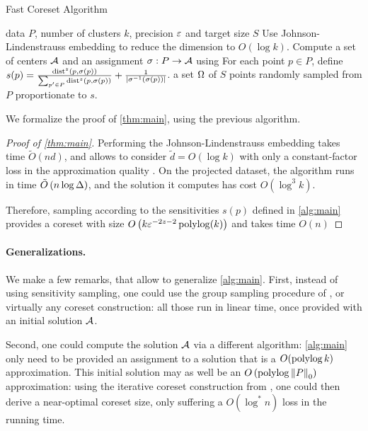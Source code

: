 \begin{algorithm}[tb]
   \caption{Fast Coreset Algorithm}
   \label{alg:main}
\begin{algorithmic}
    data $P$, number of clusters $k$, precision $\varepsilon$ and target size $S$
   \STATE Use Johnson-Lindenstrauss embedding to reduce the dimension to $O(\log k)$.
   \STATE Compute a set of centers $\mathcal A$ and an assignment $\sigma : P \rightarrow \mathcal A$ using \fkmeans
   \STATE For each point $p \in P$, define $s(p) = \frac{\operatorname{dist}^z(p, \sigma(p))}{\sum_{p' \in P} \operatorname{dist}^z(p, \sigma(p))} + \frac{1}{|\sigma^{-1}(\sigma(p))|}$.
    a set $\Omega$ of $S$ points randomly sampled from $P$ proportionate to $s$.
\end{algorithmic}
\end{algorithm}


We formalize the proof of \cref{thm:main}, using the previous algorithm.

\begin{proof}[Proof of \cref{thm:main}]
Performing the Johnson-Lindenstrauss embedding takes time $\tilde O(nd)$, and allows to consider $\tilde d=O(\log k)$ with only a constant-factor loss in the approximation quality  \cite{makarychev2019performance}. 
On the projected dataset, the algorithm \fkmeans runs in time $\tilde O\left( n \log \Delta\right)$, and the solution it computes has cost $O(\log^3 k)$. 

Therefore, sampling according to the sensitivities $s(p)$ defined in \cref{alg:main} provides a coreset with size $O \left( k \varepsilon^{-2z -2}\operatorname{polylog}(k) \right)$  and takes time $O(n)$ 
\end{proof}

\paragraph{Generalizations.} 
We make a few remarks, that allow to generalize \cref{alg:main}.
First, instead of using sensitivity sampling, one could use the group sampling procedure of \cite{stoc21}, or virtually any coreset construction: all those run in linear time, once provided with an initial solution $\mathcal A$. 

Second, one could compute the solution $\mathcal A$ via a different algorithm: \cref{alg:main} only need to be provided an assignment to a solution that is a $O(\operatorname{polylog} k)$ approximation. 
This initial solution may as well be an $O\left(\operatorname{polylog} \left\| P \right\|_0 \right)$ approximation: using the iterative coreset construction from \cite{BravermanJKW21}, one could then derive a near-optimal coreset size, only suffering a $O(\log^* n)$ loss in the running time.